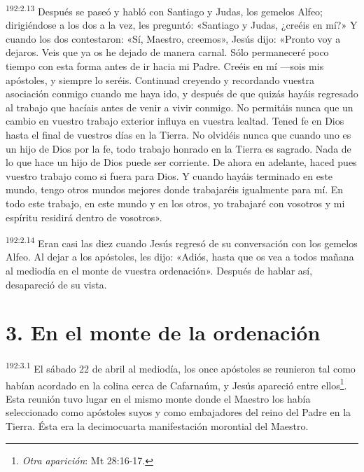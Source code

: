 \par 
\textsuperscript{192:2.13} Después se paseó y habló con Santiago y Judas, los gemelos Alfeo; dirigiéndose a los dos a la vez, les preguntó: «Santiago y Judas, ¿creéis en mí?» Y cuando los dos contestaron: «Sí, Maestro, creemos», Jesús dijo: «Pronto voy a dejaros. Veis que ya os he dejado de manera carnal. Sólo permaneceré poco tiempo con esta forma antes de ir hacia mi Padre. Creéis en mí ---sois mis apóstoles, y siempre lo seréis. Continuad creyendo y recordando vuestra asociación conmigo cuando me haya ido, y después de que quizás hayáis regresado al trabajo que hacíais antes de venir a vivir conmigo. No permitáis nunca que un cambio en vuestro trabajo exterior influya en vuestra lealtad. Tened fe en Dios hasta el final de vuestros días en la Tierra. No olvidéis nunca que cuando uno es un hijo de Dios por la fe, todo trabajo honrado en la Tierra es sagrado. Nada de lo que hace un hijo de Dios puede ser corriente. De ahora en adelante, haced pues vuestro trabajo como si fuera para Dios. Y cuando hayáis terminado en este mundo, tengo otros mundos mejores donde trabajaréis igualmente para mí. En todo este trabajo, en este mundo y en los otros, yo trabajaré con vosotros y mi espíritu residirá dentro de vosotros».

\par 
\textsuperscript{192:2.14} Eran casi las diez cuando Jesús regresó de su conversación con los gemelos Alfeo. Al dejar a los apóstoles, les dijo: «Adiós, hasta que os vea a todos mañana al mediodía en el monte de vuestra ordenación». Después de hablar así, desapareció de su vista.

\section*{3. En el monte de la ordenación}
\par 
\textsuperscript{192:3.1} El sábado 22 de abril al mediodía, los once apóstoles se reunieron tal como habían acordado en la colina cerca de Cafarnaúm, y Jesús apareció entre ellos\footnote{\textit{Otra aparición}: Mt 28:16-17.}. Esta reunión tuvo lugar en el mismo monte donde el Maestro los había seleccionado como apóstoles suyos y como embajadores del reino del Padre en la Tierra. Ésta era la decimocuarta manifestación morontial del Maestro.

